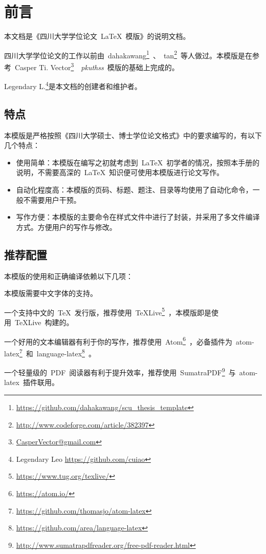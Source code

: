 \chapter{前言}
\label{Chap_Intro}
本文档是《四川大学学位论文~\LaTeX~模版》的说明文档。


四川大学学位论文的工作以前由~dahakawang\footnote{\url{https://github.com/dahakawang/scu_thesis_template}}~、~tan\footnote{\url{http://www.codeforge.com/article/382397}}~等人做过。本模版是在参考~Casper Ti. Vector\footnote{\url{CasperVector@gmail.com}}~~\emph{pkuthss}~模版\cite{pkuthss}的基础上完成的。


Legendary L.\footnote{Legendary Leo \url{https://github.com/cuiao}}是本文档的创建者和维护者。

\section{特点}
本模版是严格按照《四川大学硕士、博士学位论文格式》\cite{SCUDissertationFormat}中的要求编写的，有以下几个特点：
\begin{itemize}
	\item 使用简单：本模版在编写之初就考虑到~\LaTeX~初学者的情况，按照本手册的说明，不需要高深的~\LaTeX~知识便可使用本模版进行论文写作。
	\item 自动化程度高：本模版的页码、标题、题注、目录等均使用了自动化命令，一般不需要用户干预。
	\item 写作方便：本模版的主要命令在样式文件中进行了封装，并采用了多文件编译方式。方便用户的写作与修改。
\end{itemize}

\section{推荐配置}
本模版的使用和正确编译依赖以下几项：
\begin{description}[style=nextline,labelindent=2em,labelwidth=!]
	\item[中文字体] 本模版需要中文字体的支持。
	\item[\TeX~发行版] 一个支持中文的~\TeX~发行版，推荐使用~\TeX Live\footnote{\url{https://www.tug.org/texlive/}}~，本模版即是使用~\TeX Live~构建的。
	\item[文本编辑器] 一个好用的文本编辑器有利于你的写作，推荐使用~Atom\footnote{\url{https://atom.io/}}~，必备插件为~atom-latex\footnote{\url{https://github.com/thomasjo/atom-latex}}~和~language-latex\footnote{\url{https://github.com/area/language-latex}}~。
	\item[PDF~阅读器] 一个轻量级的~PDF~阅读器有利于提升效率，推荐使用~SumatraPDF\footnote{\url{http://www.sumatrapdfreader.org/free-pdf-reader.html}}~与~atom-latex~插件联用。
\end{description}



